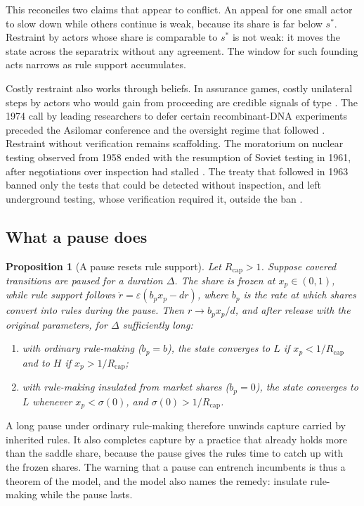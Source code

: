\documentclass[11pt]{article}
\theoremstyle{plain}
\newtheorem{proposition}{Proposition}
\theoremstyle{definition}
\newcommand{\Rcap}{R_{\mathrm{cap}}}
\begin{document}
This reconciles two claims that appear to conflict. An appeal for one small actor to slow down while others continue is weak, because its share is far below $s^\ast$. Restraint by actors whose share is comparable to $s^\ast$ is not weak: it moves the state across the separatrix without any agreement. The window for such founding acts narrows as rule support accumulates.

Costly restraint also works through beliefs. In assurance games, costly unilateral steps by actors who would gain from proceeding are credible signals of type \citep{kydd2000}. The 1974 call by leading researchers to defer certain recombinant-DNA experiments preceded the Asilomar conference and the oversight regime that followed \citep{berg1974,berg1975}. Restraint without verification remains scaffolding. The moratorium on nuclear testing observed from 1958 ended with the resumption of Soviet testing in 1961, after negotiations over inspection had stalled \citep{divine1978}. The treaty that followed in 1963 banned only the tests that could be detected without inspection, and left underground testing, whose verification required it, outside the ban \citep{seaborg1981}.

\subsection{What a pause does}

\begin{proposition}[A pause resets rule support]\label{prop:pause}
Let $\Rcap>1$. Suppose covered transitions are paused for a duration $\Delta$. The share is frozen at $x_p\in(0,1)$, while rule support follows $\dot r=\varepsilon(b_px_p-dr)$, where $b_p$ is the rate at which shares convert into rules during the pause. Then $r\to b_px_p/d$, and after release with the original parameters, for $\Delta$ sufficiently long:
\begin{enumerate}[label=(\roman*),leftmargin=*]
\item with ordinary rule-making ($b_p=b$), the state converges to $L$ if $x_p<1/\Rcap$ and to $H$ if $x_p>1/\Rcap$;
\item with rule-making insulated from market shares ($b_p=0$), the state converges to $L$ whenever $x_p<\sigma(0)$, and $\sigma(0)>1/\Rcap$.
\end{enumerate}
\end{proposition}

A long pause under ordinary rule-making therefore unwinds capture carried by inherited rules. It also completes capture by a practice that already holds more than the saddle share, because the pause gives the rules time to catch up with the frozen shares. The warning that a pause can entrench incumbents is thus a theorem of the model, and the model also names the remedy: insulate rule-making while the pause lasts.
\end{document}
